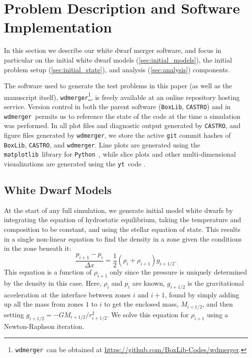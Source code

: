 \documentclass[iop]{../emulateapj}
\newcommand{\boxlib}{\texttt{BoxLib}}
\newcommand{\castro}{\texttt{CASTRO}}
\newcommand{\wdmerger}{\texttt{wdmerger}}
\newcommand{\python}{\texttt{Python}}
\newcommand{\matplotlib}{\texttt{matplotlib}}
\newcommand{\yt}{\texttt{yt}}
\begin{document}
\section{Problem Description and Software Implementation}
\label{sec:implementation}

In this section we describe our white dwarf merger software, and focus in 
particular on the initial white dwarf models (\autoref{sec:initial_models}), 
the initial problem setup (\autoref{sec:initial_state}), and analysis 
(\autoref{sec:analysis}) components.

The software used to generate the test problems in this paper
(as well as the manuscript itself),
\wdmerger\footnote{\wdmerger\ can be obtained at \url{https://github.com/BoxLib-Codes/wdmerger}.},
is freely available at an online repository hosting service.
Version control in both the parent software (\boxlib, \castro) and in \wdmerger\
permits us to reference the state of the code at the time a simulation
was performed. In all plot files and diagnostic output generated by \castro, 
and figure files generated by \wdmerger,
we store the active \texttt{git} commit hashes of \boxlib, \castro, and \wdmerger.
Line plots are generated using the \matplotlib\ library for \python\ 
\citep{matplotlib}, while slice plots and other multi-dimensional visualizations are 
generated using the \yt\ code \citep{yt}.

\subsection{White Dwarf Models}
\label{sec:initial_models}

At the start of any full simulation, we generate initial model white
dwarfs by integrating the equation of hydrostatic equilibrium, taking
the temperature and composition to be constant, and using the
stellar equation of state.  This results in a single non-linear
equation to find the density in a zone given the conditions in the
zone beneath it:
\begin{equation}
\frac{p_{i+1} - p_i}{\Delta x} = \frac{1}{2} (\rho_i + \rho_{i+1}) g_{i+1/2}.
\end{equation}
This equation is a function of $\rho_{i+1}$ only since the pressure is
uniquely determined by the density in this case. Here, $\rho_i$ and $p_i$
are known, $g_{i+1/2}$ is the gravitational acceleration at the
interface between zones $i$ and $i+1$, found by simply adding up all
the mass from zones $1$ to $i$ to get the enclosed mass,
$M_{i+1/2}$, and then setting $g_{i+1/2} =
-GM_{i+1/2}/r_{i+1/2}^2$. We solve this equation for $\rho_{i+1}$
using a Newton-Raphson iteration.
\end{document}
